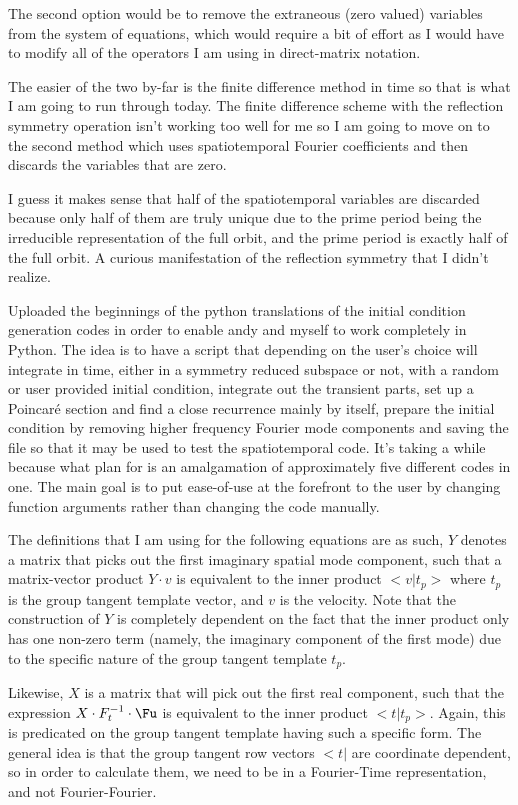 The second option would be to remove the extraneous (zero valued) variables
from the system of equations, which would require a bit of effort as
I would have to modify all of the operators I am using in direct-matrix
notation.

The easier of the two by-far is the finite difference method in time so that
is what I am going to run through today.
The finite difference scheme with the reflection symmetry operation isn't
working too well for me so I am going to move on to the second method
which uses spatiotemporal Fourier coefficients and then discards the variables
that are zero.

I guess it makes sense that half of the spatiotemporal variables are discarded
because only half of them are truly unique due to the prime period being
the irreducible representation of the full orbit, and the prime period is
exactly half of the full orbit. A curious manifestation of the reflection
symmetry that I didn't realize.


Uploaded the beginnings of the python translations of the initial condition generation codes in order
to enable andy and myself to work completely in Python. The idea is to have a script that depending
on the user's choice will integrate in time, either in a symmetry reduced
subspace or not, with a random or user provided initial condition, integrate out the transient parts,
set up a Poincar\'e section and find a close recurrence mainly by itself, prepare the initial condition
by removing higher frequency Fourier mode components and saving the file so that it may be used
to test the spatiotemporal code. It's taking a while because what plan for is an amalgamation of
approximately five different codes in one. The main goal is to put ease-of-use at the forefront
to the user by changing function arguments rather than changing the code manually.

The definitions that I am using for the following equations are as such,
$Y$ denotes a matrix that picks out the first imaginary spatial mode component,
such that a matrix-vector product $Y \cdot v$ is equivalent to the inner product
$< v | t_p >$ where $t_p$ is the group tangent template vector, and $v$ is the
velocity. Note that the construction of $Y$ is completely dependent on the fact
that the inner product only has one non-zero term (namely, the imaginary component
of the first mode) due to the specific nature of the group tangent template $t_p$.

Likewise, $X$ is a matrix that will pick out the first real component, such that
the expression $X \cdot F^{-1}_t \cdot \Fu$ is equivalent to the inner product
$<t | t_p>$. Again, this is predicated on the group tangent template having such
a specific form. The general idea is that the group tangent row vectors $<t|$
are coordinate dependent, so in order to calculate them, we need to be in a
Fourier-Time representation, and not Fourier-Fourier.

